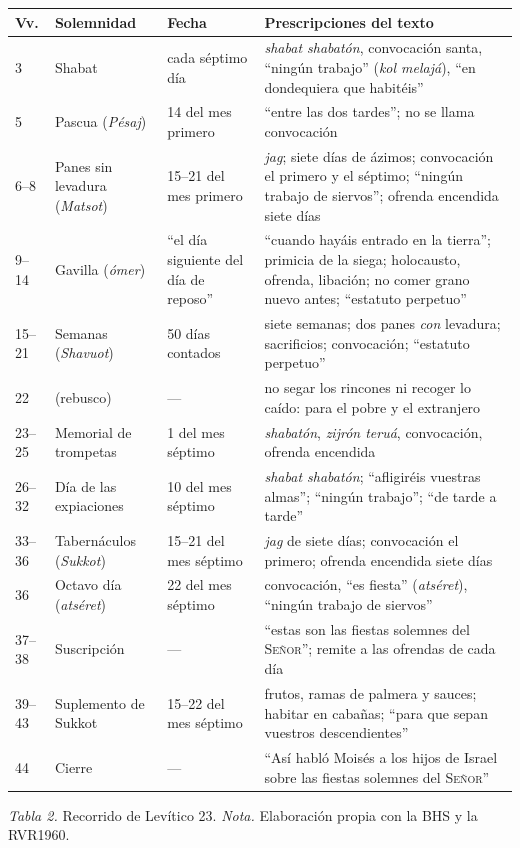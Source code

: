 \documentclass[11pt,letterpaper]{article}
\newcommand{\SENOR}{\textsc{Señor}}
\begin{document}
\begin{center}\small\renewcommand{\arraystretch}{1.18}
\begin{tabular}{@{}L{1.5cm}L{3.3cm}L{2.7cm}L{7.6cm}@{}}
\toprule
\textbf{Vv.} & \textbf{Solemnidad} & \textbf{Fecha} & \textbf{Prescripciones del texto} \\  & Shabat & cada séptimo día & \emph{shabat shabatón}, convocación santa, ``ningún trabajo'' (\emph{kol melajá}), ``en dondequiera que habitéis'' \\
5 & Pascua (\emph{Pésaj}) & 14 del mes primero & ``entre las dos tardes''; no se llama convocación \\
6--8 & Panes sin levadura (\emph{Matsot}) & 15--21 del mes primero & \emph{jag}; siete días de ázimos; convocación el primero y el séptimo; ``ningún trabajo de siervos''; ofrenda encendida siete días \\
9--14 & Gavilla (\emph{ómer}) & ``el día siguiente del día de reposo'' & ``cuando hayáis entrado en la tierra''; primicia de la siega; holocausto, ofrenda, libación; no comer grano nuevo antes; ``estatuto perpetuo'' \\
15--21 & Semanas (\emph{Shavuot}) & 50 días contados & siete semanas; dos panes \emph{con} levadura; sacrificios; convocación; ``estatuto perpetuo'' \\
22 & (rebusco) & --- & no segar los rincones ni recoger lo caído: para el pobre y el extranjero \\
23--25 & Memorial de trompetas & 1 del mes séptimo & \emph{shabatón}, \emph{zijrón teruá}, convocación, ofrenda encendida \\
26--32 & Día de las expiaciones & 10 del mes séptimo & \emph{shabat shabatón}; ``afligiréis vuestras almas''; ``ningún trabajo''; ``de tarde a tarde'' \\
33--36 & Tabernáculos (\emph{Sukkot}) & 15--21 del mes séptimo & \emph{jag} de siete días; convocación el primero; ofrenda encendida siete días \\
36 & Octavo día (\emph{atséret}) & 22 del mes séptimo & convocación, ``es fiesta'' (\emph{atséret}), ``ningún trabajo de siervos'' \\
37--38 & Suscripción & --- & ``estas son las fiestas solemnes del \SENOR''; remite a las ofrendas de cada día \\
39--43 & Suplemento de Sukkot & 15--22 del mes séptimo & frutos, ramas de palmera y sauces; habitar en cabañas; ``para que sepan vuestros descendientes'' \\
44 & Cierre & --- & ``Así habló Moisés a los hijos de Israel sobre las fiestas solemnes del \SENOR'' \\
\bottomrule
\end{tabular}\par
{\footnotesize\color{sepia}\textit{Tabla 2.} Recorrido de Levítico 23. \textit{Nota.} Elaboración propia con la BHS y la RVR1960.}
\end{center}
\end{document}
